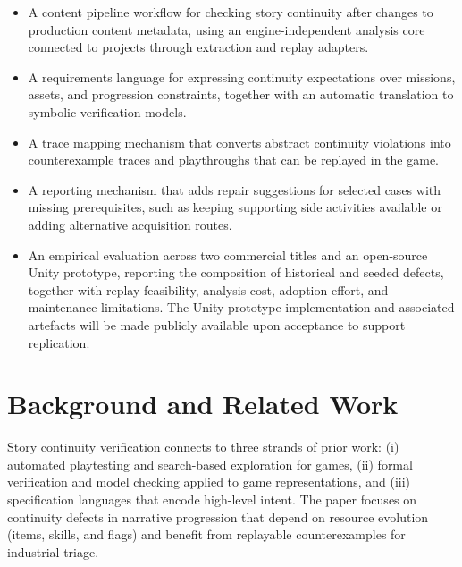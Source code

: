 \documentclass[conference]{IEEEtran}
\begin{document}
\begin{itemize}[leftmargin=1.3em]
  \item A content pipeline workflow for checking story continuity after
      changes to production content metadata, using an engine-independent
      analysis core connected to projects through extraction and replay
      adapters.

  \item A requirements language for expressing continuity expectations
      over missions, assets, and progression constraints, together
      with an automatic translation to symbolic verification models.

  \item A trace mapping mechanism that converts abstract continuity
        violations into counterexample traces and playthroughs that can
        be replayed in the game.

  \item A reporting mechanism that adds repair suggestions for selected
        cases with missing prerequisites, such as keeping supporting side
        activities available or adding alternative acquisition routes.

  \item An empirical evaluation across two commercial titles and an
      open-source Unity prototype, reporting the composition of historical
      and seeded defects, together with replay feasibility, analysis
      cost, adoption effort, and maintenance limitations. The Unity
      prototype implementation and associated artefacts will be made
      publicly available upon acceptance to support replication.
\end{itemize}

\section{Background and Related Work}
\label{sec:related}

Story continuity verification connects to three strands of prior work:
(i) automated playtesting and search-based exploration for games,
(ii) formal verification and model checking applied to game
representations, and (iii) specification languages that encode
high-level intent. The paper focuses on continuity defects in narrative
progression that depend on resource evolution (items, skills, and flags)
and benefit from replayable counterexamples for industrial triage.
\end{document}
